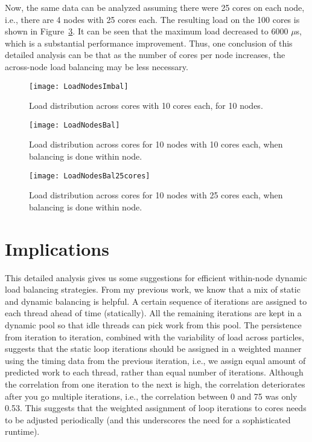 \documentclass[11pt]{article}
\begin{document}
Now, the same data can be analyzed assuming there were 25 cores on
each node, i.e., there are 4 nodes with 25 cores each. The resulting
load on the 100 cores is shown in Figure~\ref{fig:loadNodesBal25}. It
can be seen that the maximum load decreased to 6000 $\mu$s, which is a
substantial performance improvement. Thus, one conclusion of this detailed
analysis can be that as the number of cores per node increases, the
across-node load balancing may be less necessary.  

\begin{figure}[ht!]
\label{fig:loadNodesImbal}
\begin{center}
\texttt{[image: LoadNodesImbal]}
\end{center}
\caption{\label{fig:loadNodesImbal}Load distribution across cores with 10 cores each, for 10 nodes.}
\end{figure}

\begin{figure}[ht!]
\label{fig:loadNodesBal}
\begin{center}
\texttt{[image: LoadNodesBal]}
\end{center}
\caption{\label{fig:loadNodesBal}Load distribution across cores for 10
  nodes with 10 cores each, when balancing is done within node.}
\end{figure}

\begin{figure}[ht!]
\label{fig:loadNodesBal25}
\begin{center}
\texttt{[image: LoadNodesBal25cores]}
\end{center}
\caption{\label{fig:loadNodesBal25}Load distribution across
  cores for 10 nodes with 25 cores each, when balancing is done within
  node.}
\end{figure}

\section{Implications} 
This detailed analysis gives us some suggestions for efficient
within-node dynamic load balancing strategies. From my previous work,
we know that a mix of static and dynamic balancing is helpful. A
certain sequence of iterations are assigned to each thread ahead of
time (statically). All the remaining iterations are kept in a dynamic
pool so that idle threads can pick work from this pool. The
persistence from iteration to iteration, combined with the variability
of load across particles, suggests that the static loop iterations
should be assigned in a weighted manner using the timing data from the
previous iteration, i.e., we assign equal amount of predicted work to each
thread, rather than equal number of iterations. Although the
correlation from one iteration to the next is high, the correlation
deteriorates after you go multiple iterations, i.e., the correlation
between 0 and 75 was only 0.53. This suggests that the weighted
assignment of loop iterations to cores needs 
to be adjusted periodically (and this underscores the need for a
sophisticated runtime).




\end{document}
